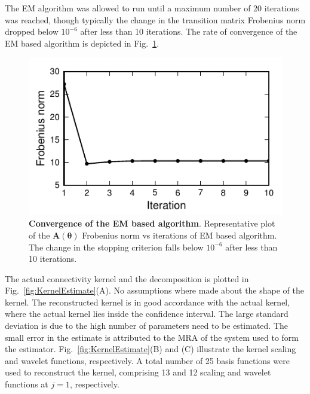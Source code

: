 \documentclass[review,authoryear,3p]{elsarticle}
\begin{document}
The EM algorithm was allowed to run until a maximum number of 20 iterations was reached, though typically the change in the transition matrix Frobenius norm dropped below $10^{-6}$ after less than 10 iterations. The rate of convergence of the EM based algorithm is depicted in Fig.~\ref{fig:MRA-Convergence}. 
\begin{figure}[t]
 	\centering
 		\includegraphics[scale=1]{./Graph/fig8.pdf}
 		\caption{{\bf Convergence of the EM based algorithm}. Representative plot of
the $\mathbf A(\boldsymbol\theta)$ Frobenius norm vs iterations of EM based algorithm. The change in the stopping criterion falls below $10^{-6}$ after less than 10 iterations.} 
\label{fig:MRA-Convergence}  
 \end{figure}     
The actual connectivity kernel and the decomposition is plotted in Fig.~\ref{fig:KernelEstimate}(A). No assumptions where made about the shape of the kernel. The reconstructed kernel is in good accordance with the actual kernel, where the actual kernel lies inside the confidence interval. The large standard deviation is due to the high number of parameters need to be estimated. The small error in the estimate is attributed to the MRA of the system used to form the estimator. Fig.~\ref{fig:KernelEstimate}(B) and (C) illustrate the kernel scaling and wavelet functions, respectively. A total number of 25 basis functions were used to reconstruct the kernel, comprising 13 and 12 scaling and wavelet functions at $j=1$, respectively. 
\end{document}
